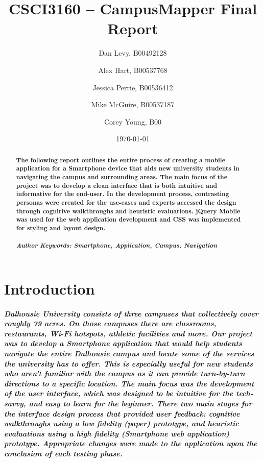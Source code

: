 \documentclass{report}
\title{CSCI3160 -- CampusMapper Final Report}
\author{Dan Levy, B00492128 \and Alex Hart, B00537768 \and Jessica Perrie,
B00536412 \and Mike McGuire, B00537187 \and Corey Young, B00}
\date{\today}
\begin{document}
\maketitle
\tableofcontents
\listoffigures
\begin{abstract}
    \paragraph{The following report outlines the entire process of creating a
    mobile application for a Smartphone device that aids new university students in
    navigating the campus and surrounding areas. The main focus of the project was
    to develop a clean interface that is both intuitive and informative for the
    end-user. In the development process, contrasting personas were created for the
    use-cases and experts accessed the design through cognitive walkthroughs and
    heuristic evaluations. jQuery Mobile was used for the web application
    development and CSS was implemented for styling and layout design.}
    \paragraph{\emph{Author Keywords: Smartphone, Application, Campus, Navigation}}
\end{abstract}
\chapter{Introduction}
    \paragraph{Dalhousie University consists of three campuses that collectively
    cover roughly 79 acres. On those campuses there are classrooms, restaurants,
    Wi-Fi hotspots, athletic facilities and more. Our project was to develop a
    Smartphone application that would help students navigate the entire Dalhousie
    campus and locate some of the services the university has to offer. This is
    especially useful for new students who aren’t familiar with the campus as it can
    provide turn-by-turn directions to a specific location. The main focus was the
    development of the user interface, which was designed to be intuitive for the
    tech-savvy, and easy to learn for the beginner. There two main stages for the
    interface design process that provided user feedback: cognitive walkthroughs
    using a low fidelity (paper) prototype, and heuristic evaluations using a high
    fidelity (Smartphone web application) prototype. Appropriate changes were made
    to the application upon the conclusion of each testing phase.}
\end{document}
